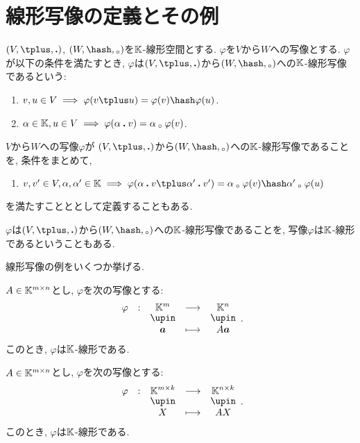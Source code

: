 \section{線形写像の定義とその例}
\begin{definition}
  $(V,\plus,\act)$, $(W,\pplus,\aact)$を$\mathbb{K}$-線形空間とする.
  $\varphi$を$V$から$W$への写像とする.
  $\varphi$が以下の条件を満たすとき,
  $\varphi$は$(V,\plus,\act)$から$(W,\pplus,\aact)$への$\mathbb{K}$-線形写像であるという:
  \begin{enumerate}
    \item $v,u\in V\implies \varphi(v\plus u)=\varphi(v)\pplus\varphi(u)$.
    \item $\alpha\in \mathbb{K}, u\in V\implies \varphi(\alpha\mathbin{\boldsymbol{.}} v)=\alpha\mathbin{{}_\circ}\varphi(v)$.
  \end{enumerate}
\end{definition}

\begin{remark}
  $V$から$W$への写像$\varphi$が
  $(V,\plus,\act)$から$(W,\pplus,\aact)$への$\mathbb{K}$-線形写像であることを,
  条件をまとめて,
  \begin{enumerate}
    \item $v,v'\in V, \alpha,\alpha'\in\KK\implies \varphi(\alpha\act v\plus \alpha'\act v')=\alpha\aact \varphi(v)\pplus \alpha'\aact\varphi(u)$
  \end{enumerate}
  を満たすことととして定義することもある.
\end{remark}

\begin{remark}
  $\varphi$は$(V,\plus,\act)$から$(W,\pplus,\aact)$への$\mathbb{K}$-線形写像であることを,
  写像$\varphi$は$\mathbb{K}$-線形であるということもある.
\end{remark}

線形写像の例をいくつか挙げる.

\begin{example}
  $A\in \mathbb{K}^{m\times n}$とし,
  $\varphi$を次の写像とする:
  \begin{align*}
    \shazo{\varphi}{\KK^m}{\KK^n}{\aaa}{A\aaa}.
  \end{align*}
  このとき, $\varphi$は$\mathbb{K}$-線形である.
\end{example}

\begin{example}
  $A\in \mathbb{K}^{m\times n}$とし,
  $\varphi$を次の写像とする:
  \begin{align*}
    \shazo{\varphi}{\KK^{m\times k}}{\KK^{n\times k}}{X}{AX}.
  \end{align*}
  このとき, $\varphi$は$\mathbb{K}$-線形である.
\end{example}

